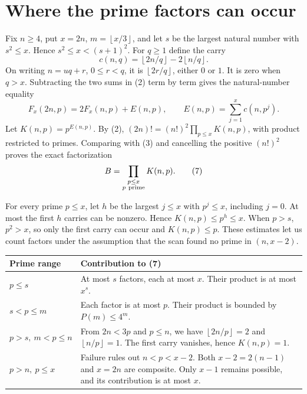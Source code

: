 \documentclass[12pt,letterpaper]{article}
\newcommand{\fl}[1]{\left\lfloor #1\right\rfloor}
\newcommand{\pagepart}{\clearpage}
\begin{document}
\pagepart\section{Where the prime factors can occur}\label{s:factors}
Fix \(n\ge4\), put \(x=2n\), \(m=\fl{x/3}\), and let \(s\) be the largest natural number with \(s^2\le x\). Hence \(s^2\le x<(s+1)^2\). For \(q\ge1\) define the carry
\[
 c(n,q)=\fl{2n/q}-2\fl{n/q}.
\]
On writing \(n=uq+r\), \(0\le r<q\), it is \(\fl{2r/q}\), either \(0\) or \(1\). It is zero when \(q>x\). Subtracting the two sums in (2) term by term gives the natural-number equality
\[
 F_x(2n,p)=2F_x(n,p)+E(n,p),\qquad
 E(n,p)=\sum_{j=1}^{x}c(n,p^j).
\]
Let \(K(n,p)=p^{E(n,p)}\). By (2), \((2n)!=(n!)^2\prod_{p\le x} K(n,p)\), with product restricted to primes. Comparing with (3) and cancelling the positive \((n!)^2\) proves the exact factorization
\[
 B=\prod_{\substack{p\le x\\p\ {\rm prime}}} K(n,p). \tag{7}\label{eq:fac}
\]

For every prime \(p\le x\), let \(h\) be the largest \(j\le x\) with \(p^j\le x\), including \(j=0\). At most the first \(h\) carries can be nonzero. Hence \(K(n,p)\le p^h\le x\). When \(p>s\), \(p^2>x\), so only the first carry can occur and \(K(n,p)\le p\). These estimates let us count factors under the assumption that the scan found no prime in \((n,x-2)\).

\smallskip
\begin{tabularx}{\linewidth}{@{}p{.21\linewidth} X@{}}
\toprule
\textsf{Prime range} & \textsf{Contribution to (7)}\\ \midrule
\(p\le s\) & At most \(s\) factors, each at most \(x\). Their product is at most \(x^s\).\\[3pt]
\(s<p\le m\) & Each factor is at most \(p\). Their product is bounded by \(P(m)\le4^m\).\\[3pt]
\(p>s,\ m<p\le n\) & From \(2n<3p\) and \(p\le n\), we have \(\fl{2n/p}=2\) and \(\fl{n/p}=1\). The first carry vanishes, hence \(K(n,p)=1\).\\[3pt]
\(p>n,\ p\le x\) & Failure rules out \(n<p<x-2\). Both \(x-2=2(n-1)\) and \(x=2n\) are composite. Only \(x-1\) remains possible, and its contribution is at most \(x\).\\
\bottomrule
\end{tabularx}
\smallskip
\end{document}
